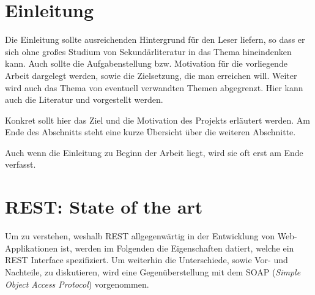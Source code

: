 \documentclass[fleqn,10.5pt,ngerman]{SelfArx}
\affiliation{\textit{Hochschule Kaiserslautern}} %
\affiliation{\textbf{Corresponding author}: max.mustermann@fh-kl.de} %
\newlength{\tocsep}
\begin{document}
\flushbottom %

\maketitle %

\tableofcontents %

\thispagestyle{empty} %


\section*{Einleitung} %


Die Einleitung sollte ausreichenden Hintergrund für den Leser liefern, so dass er sich ohne großes Studium von Sekundärliteratur
in das Thema hineindenken kann. Auch sollte die Aufgabenstellung bzw. Motivation für die vorliegende Arbeit dargelegt werden, sowie die Zielsetzung, die man erreichen will. Weiter wird auch das Thema von eventuell verwandten Themen abgegrenzt. Hier kann auch die Literatur \cite{Harel:1987,Harel2006} und \cite{Gurp99onthe} vorgestellt werden.

Konkret sollt hier das Ziel und die Motivation des Projekts erläutert werden. Am Ende des Abschnitts steht eine kurze Übersicht über die weiteren Abschnitte.

Auch wenn die Einleitung zu Beginn der Arbeit liegt, wird sie oft erst am Ende verfasst.


\section{REST: State of the art}
Um zu verstehen, weshalb REST allgegenwärtig in der Entwicklung von Web-Applikationen ist, werden im Folgenden die Eigenschaften datiert, welche ein REST Interface spezifiziert. Um weiterhin die Unterschiede, sowie Vor- und Nachteile, zu diskutieren, wird eine Gegenüberstellung mit dem SOAP (\textit{Simple Object Access Protocol}) vorgenommen. 
\end{document}
